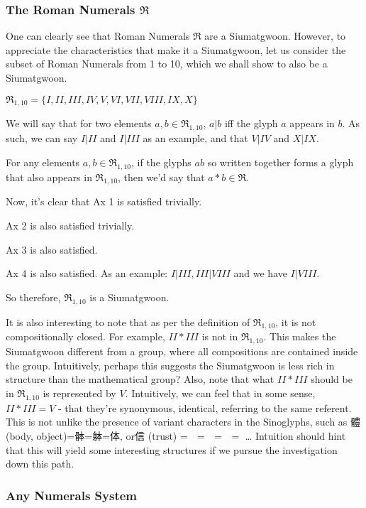 \subsubsection{The Roman Numerals $\mathfrak{R}$}

One can clearly see that Roman Numerals $\mathfrak{R}$ are a Siumatgwoon. However, to appreciate the characteristics that make it a Siumatgwoon, let us consider the subset of Roman Numerals from 1 to 10, which we shall show to also be a Siumatgwoon.

$\mathfrak{R}_{1,10} = \{I, II, III, IV, V, VI, VII, VIII, IX, X\}$

We will say that for two elements $a,b \in \mathfrak{R}_{1,10}$, $a|b$ iff the glyph $a$ appears in $b$. As such, we can say $I | II$ and $I|III$ as an example, and that $V|IV$ and $X|IX$. 

For any elements $a,b\in \mathfrak{R}_{1,10}$, if the glyphs $ab$ so written together forms a glyph that also appears in $\mathfrak{R}_{1,10}$, then we'd say that $a*b\in \mathfrak{R}$.

Now, it's clear that Ax 1 is satisfied trivially. 

Ax 2 is also satisfied trivially.

Ax 3 is also satisfied. 

Ax 4 is also satisfied. As an example: $I | III, III | VIII$ and we have $I|VIII$.

So therefore, $\mathfrak{R}_{1,10}$ is a Siumatgwoon. 

It is also interesting to note that as per the definition of $\mathfrak{R}_{1,10}$, it is not compositionally closed. For example, $II * III$ is not in $\mathfrak{R}_{1,10}$. This makes the Siumatgwoon different from a group, where all compositions are contained inside the group. Intuitively, perhaps this suggests the Siumatgwoon is less rich in structure than the mathematical group? Also, note that what $II * III$ should be in $\mathfrak{R}_{1,10}$ is represented by $V$. Intuitively, we can feel that in some sense, $II * III = V$ - that they're synonymous, identical, referring to the same referent. This is not unlike the presence of variant characters in the Sinoglyphs, such as 體 (body, object)=骵=躰=体, or信 (trust) = 𬢭 = 伩 = 訫 = 㐰… Intuition should hint that this will yield some interesting structures if we pursue the investigation down this path.

\subsubsection{Any Numerals System}


